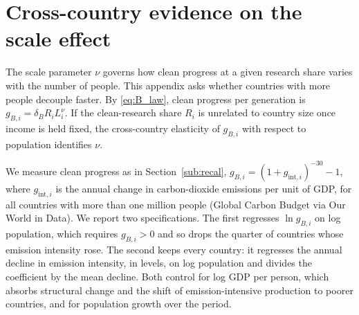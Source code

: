 \documentclass[11pt]{article}
\begin{document}
\clearpage
\section{Cross-country evidence on the scale effect}
\label{app:nu}
\setcounter{table}{0}
The scale parameter $\nu$ governs how clean progress at a given research share varies with the number of
people. This appendix asks whether countries with more people decouple faster. By \eqref{eq:B_law},
clean progress per generation is $g_{B,i}=\delta_BR_iL_i^{\nu}$. If the clean-research share $R_i$ is
unrelated to country size once income is held fixed, the cross-country elasticity of $g_{B,i}$ with
respect to population identifies $\nu$.

We measure clean progress as in Section~\ref{sub:recal}, $g_{B,i}=(1+g_{\text{int},i})^{-30}-1$, where
$g_{\text{int},i}$ is the annual change in carbon-dioxide emissions per unit of GDP, for all countries with
more than one million people (Global Carbon Budget via Our World in Data). We report two specifications.
The first regresses $\ln g_{B,i}$ on log population, which requires $g_{B,i}>0$ and so drops the quarter of
countries whose emission intensity rose. The second keeps every country: it regresses the annual decline
in emission intensity, in levels, on log population and divides the coefficient by the mean decline. Both
control for log GDP per person, which absorbs structural change and the shift of emission-intensive
production to poorer countries, and for population growth over the period.
\end{document}
